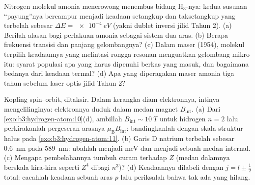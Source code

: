 \begin{exercise}[$\star\star$]\label{exo:b3:spin-two-level:9}
Nitrogen molekul amonia menerowong menembus bidang H$_3$-nya:
kedua susunan ``payung''nya bercampur menjadi keadaan setangkup
dan taksetangkup yang terbelah sebesar $\Delta E = \qty{e-4}{eV}$ (yakni
dublet inversi jilid Tahun 2). (a) Berilah alasan bagi perlakuan amonia
sebagai sistem dua aras. (b) Berapa frekuensi transisi dan panjang
gelombangnya? (c) Dalam maser (1954), molekul terpilih keadaannya yang
melintasi rongga resonan menguatkan gelombang mikro itu: syarat populasi
apa yang harus dipenuhi berkas yang masuk, dan bagaimana bedanya dari
keadaan termal? (d) Apa yang diperagakan maser amonia tiga tahun sebelum
laser optis jilid Tahun 2?
\end{exercise}

\begin{exercise}[$\star\star\star$]\label{exo:b3:spin-two-level:10}
Kopling spin--orbit, ditaksir. Dalam kerangka diam elektronnya, intinya
mengelilinginya: elektronnya duduk dalam medan magnet $B_{\text
{int}}$. (a) Dari \cref{exo:b3:hydrogen-atom:10}(d), ambillah
$B_{\text{int}} \sim \qty{10}{T}$ untuk hidrogen $n = 2$ lalu
perkirakanlah pergeseran arasnya $\mu_{\text{B}}B_{\text{int}}$:
bandingkanlah dengan skala struktur halus pada
\cref{exo:b3:hydrogen-atom:11}. (b) Garis D natrium terbelah sebesar
\qty{0.6}{nm} pada \qty{589}{nm}: ubahlah menjadi meV dan menjadi sebuah
medan internal. (c) Mengapa pembelahannya tumbuh curam terhadap $Z$
(medan dalamnya berskala kira-kira seperti $Z^4$ dibagi $n^3$)?
(d) Keadaannya dilabeli dengan $j = l \pm \tfrac12$ total: cacahlah
keadaan sebuah aras $p$ lalu periksalah bahwa tak ada yang hilang.
\end{exercise}

